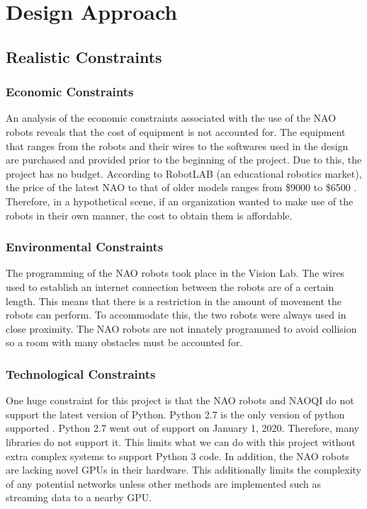 \chapter{Design Approach}
\label{ch:designapproach}
\section{Realistic Constraints}
\subsection{Economic Constraints}
An analysis of the economic constraints associated with the use of the NAO robots reveals that the cost of equipment is not accounted for. The equipment that ranges from the robots and their wires to the softwares used in the design are purchased and provided prior to the beginning of the project. Due to this, the project has no budget. According to RobotLAB (an educational robotics market), the price of the latest NAO to that of older models ranges from \$9000 to \$6500 \cite{vaudel}. Therefore, in a hypothetical scene, if an organization wanted to make use of the robots in their own manner, the cost to obtain them is affordable. \par
\subsection{Environmental Constraints}
The programming of the NAO robots took place in the Vision Lab. The wires used to establish an internet connection between the robots are of a certain length. This means that there is a restriction in the amount of movement the robots can perform. To accommodate this, the two robots were always used in close proximity. The NAO robots are not innately programmed to avoid collision so a room with many obstacles must be accounted for. \par
\subsection{Technological Constraints}
One huge constraint for this project is that the NAO robots and NAOQI do not support the latest version of Python. Python 2.7 is the only version of python supported \cite{python} . Python 2.7 went out of support on January 1, 2020. Therefore, many libraries do not support it. This limits what we can do with this project without extra complex systems to support Python 3 code. In addition, the NAO robots are lacking novel GPUs in their hardware. This additionally limits the complexity of any potential networks unless other methods are implemented such as streaming data to a nearby GPU. \par
